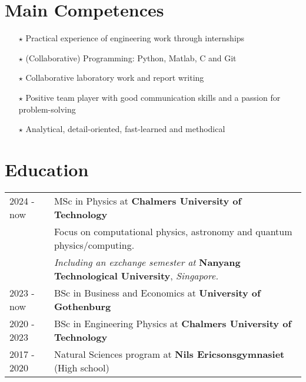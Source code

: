 \documentclass[a4paper,12pt]{article}
\begin{document}
\section{Main Competences}
\begin{itemize}
    \item[$\bm{\star}$] Practical experience of engineering work through internships
    \item[$\bm{\star}$] (Collaborative) Programming: Python, Matlab, C and Git
    \item[$\bm{\star}$] Collaborative laboratory work and report writing
    \item[$\bm{\star}$] Positive team player with good communication skills and a passion for problem-solving
    \item[$\bm{\star}$] Analytical, detail-oriented, fast-learned and methodical
\end{itemize}

\section{Education}
\begin{tabularx}{\linewidth}{@{}l X@{}}	
2024 - now &MSc in Physics at \textbf{Chalmers University of Technology} \hfill \\
&Focus on computational physics, astronomy and quantum physics/computing. \\
&\textit{Including an exchange semester at} \textbf{Nanyang Technological University}, \textit{Singapore.} \\[5pt] 

2023 - now &BSc in Business and Economics at \textbf{University of Gothenburg} \hfill \\[5pt] 

2020 - 2023 &BSc in Engineering Physics at \textbf{Chalmers University of Technology} \hfill \\[5pt] 

2017 - 2020 &Natural Sciences program at \textbf{Nils Ericsonsgymnasiet} (High school) \hfill \\ 
\end{tabularx}
\end{document}
